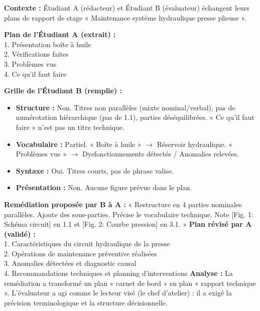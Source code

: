 \documentclass[11pt]{article}
\begin{document}
\begin{exoresolu}
\textbf{Contexte :} Étudiant A (rédacteur) et Étudiant B (évaluateur) échangent leurs plans de rapport de stage « Maintenance système hydraulique presse plieuse ».

\textbf{Plan de l'Étudiant A (extrait) :} \\
1. Présentation boîte à huile \\
2. Vérifications faites \\
3. Problèmes vus \\
4. Ce qu'il faut faire

\textbf{Grille de l'Étudiant B (remplie) :}
\begin{itemize}
    \item \textbf{Structure :} \textcolor{poppink}{Non}. Titres non parallèles (mixte nominal/verbal), pas de numérotation hiérarchique (pas de 1.1), parties déséquilibrées. « Ce qu'il faut faire » n'est pas un titre technique.
    \item \textbf{Vocabulaire :} \textcolor{poporange}{Partiel}. « Boîte à huile » $\rightarrow$ Réservoir hydraulique. « Problèmes vus » $\rightarrow$ Dysfonctionnements détectés / Anomalies relevées.
    \item \textbf{Syntaxe :} \textcolor{popgreen}{Oui}. Titres courts, pas de phrase valise.
    \item \textbf{Présentation :} \textcolor{poppink}{Non}. Aucune figure prévue dans le plan.
\end{itemize}

\textbf{Remédiation proposée par B à A :} « Restructure en 4 parties nominales parallèles. Ajoute des sous-parties. Précise le vocabulaire technique. Note [Fig. 1: Schéma circuit] en 1.1 et [Fig. 2: Courbe pression] en 3.1. »
\textbf{Plan révisé par A (validé) :} \\
1. Caractéristiques du circuit hydraulique de la presse \\
2. Opérations de maintenance préventive réalisées \\
3. Anomalies détectées et diagnostic causal \\
4. Recommandations techniques et planning d'interventions
\tcblower
\textbf{Analyse :} La remédiation a transformé un plan « carnet de bord » en plan « rapport technique ». L'évaluateur a agi comme le lecteur visé (le chef d'atelier) : il a exigé la précision terminologique et la structure décisionnelle.
\end{exoresolu}
\end{document}

